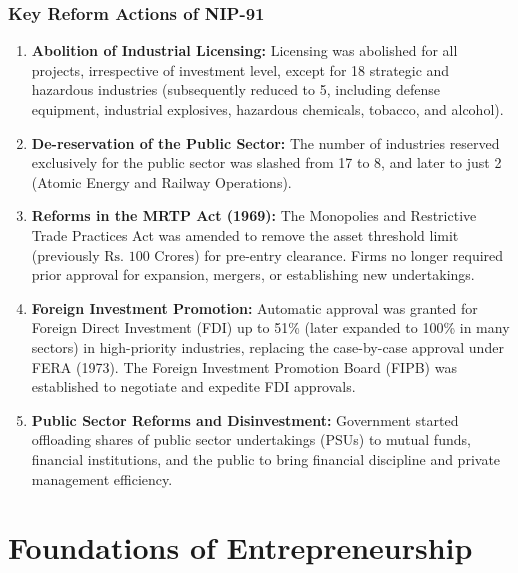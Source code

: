 \documentclass[12pt,a4paper]{article}
\begin{document}
\subsubsection{Key Reform Actions of NIP-91}
\begin{enumerate}[label=\textbf{\arabic*.}, leftmargin=*, itemsep=4pt]
  \item \textbf{Abolition of Industrial Licensing:} Licensing was abolished for all projects, irrespective of investment level, except for 18 strategic and hazardous industries (subsequently reduced to 5, including defense equipment, industrial explosives, hazardous chemicals, tobacco, and alcohol).
  \item \textbf{De-reservation of the Public Sector:} The number of industries reserved exclusively for the public sector was slashed from 17 to 8, and later to just 2 (Atomic Energy and Railway Operations).
  \item \textbf{Reforms in the MRTP Act (1969):} The Monopolies and Restrictive Trade Practices Act was amended to remove the asset threshold limit (previously $\text{Rs. } 100\text{ Crores}$) for pre-entry clearance. Firms no longer required prior approval for expansion, mergers, or establishing new undertakings.
  \item \textbf{Foreign Investment Promotion:} Automatic approval was granted for Foreign Direct Investment (FDI) up to 51\% (later expanded to 100\% in many sectors) in high-priority industries, replacing the case-by-case approval under FERA (1973). The Foreign Investment Promotion Board (FIPB) was established to negotiate and expedite FDI approvals.
  \item \textbf{Public Sector Reforms and Disinvestment:} Government started offloading shares of public sector undertakings (PSUs) to mutual funds, financial institutions, and the public to bring financial discipline and private management efficiency.
\end{enumerate}

\section{Foundations of Entrepreneurship}
\end{document}
